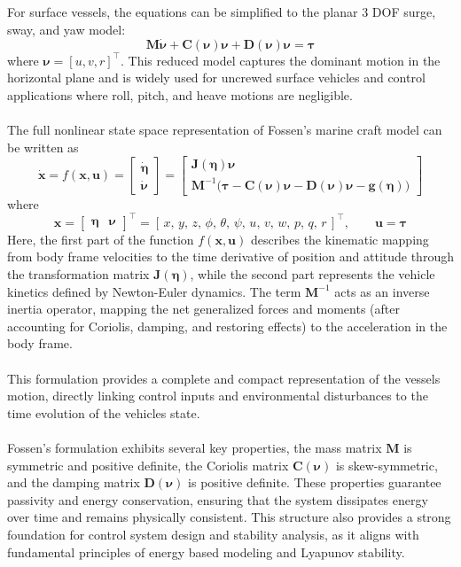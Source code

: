 \\ \\
For surface vessels, the equations can be simplified to the planar 3 DOF surge, sway, and yaw model:
$$
    \mathbf{M}\dot{\boldsymbol{\nu}} + \mathbf{C}(\boldsymbol{\nu})\boldsymbol{\nu} + \mathbf{D}(\boldsymbol{\nu})\boldsymbol{\nu} = \boldsymbol{\tau}
$$
where $\boldsymbol{\nu} = [u, v, r]^\top$. This reduced model captures the dominant motion in the horizontal plane and is widely used for uncrewed surface vehicles and control applications where roll, pitch, and heave motions are negligible.
\\ \\
The full nonlinear state space representation of Fossen's marine craft model can be written as
$$
    \dot{\mathbf{x}} = f(\mathbf{x}, \mathbf{u}) =
    \begin{bmatrix}
        \dot{\boldsymbol{\eta}} \\
        \dot{\boldsymbol{\nu}}
    \end{bmatrix}
    =
    \begin{bmatrix}
        \mathbf{J}(\boldsymbol{\eta})\boldsymbol{\nu} \\
        \mathbf{M}^{-1}\big(\boldsymbol{\tau} - \mathbf{C}(\boldsymbol{\nu})\boldsymbol{\nu} - \mathbf{D}(\boldsymbol{\nu})\boldsymbol{\nu} - \mathbf{g}(\boldsymbol{\eta})\big)
    \end{bmatrix}
$$
where
$$
    \mathbf{x} =
    \begin{bmatrix}
        \boldsymbol{\eta} & \boldsymbol{\nu}
    \end{bmatrix}^\top
    =
    [\,x,\, y,\, z,\, \phi,\, \theta,\, \psi,\, u,\, v,\, w,\, p,\, q,\, r\,]^\top,
    \qquad
    \mathbf{u} = \boldsymbol{\tau}
$$
Here, the first part of the function $f(\mathbf{x}, \mathbf{u})$ describes the kinematic mapping from body frame velocities to the time derivative of position and attitude through the transformation matrix $\mathbf{J}(\boldsymbol{\eta})$, while the second part represents the vehicle kinetics defined by Newton-Euler dynamics. The term $\mathbf{M}^{-1}$ acts as an inverse inertia operator, mapping the net generalized forces and moments (after accounting for Coriolis, damping, and restoring effects) to the acceleration in the body frame.  
\\ \\
This formulation provides a complete and compact representation of the vessels motion, directly linking control inputs and environmental disturbances to the time evolution of the vehicles state.
\\ \\
Fossen's formulation exhibits several key properties, the mass matrix $\mathbf{M}$ is symmetric and positive definite, the Coriolis matrix $\mathbf{C}(\boldsymbol{\nu})$ is skew-symmetric, and the damping matrix $\mathbf{D}(\boldsymbol{\nu})$ is positive definite. These properties guarantee passivity and energy conservation, ensuring that the system dissipates energy over time and remains physically consistent. This structure also provides a strong foundation for control system design and stability analysis, as it aligns with fundamental principles of energy based modeling and Lyapunov stability.



